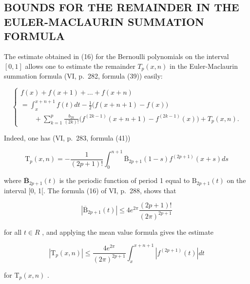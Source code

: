 \subsection{BOUNDS FOR THE REMAINDER IN THE EULER-MACLAURIN SUMMATION FORMULA}

The estimate obtained in (16) for the Bernoulli polynomials on the interval \([0, 1]\) allows one to estimate the remainder \(T_{p}(x, n)\) in the Euler-Maclaurin summation formula (VI, p.~282, formula (39)) easily:

\[
\left\{ \begin{array}{l} f (x) + f (x + 1) + \dots + f (x + n) \\ = \int_ {x} ^ {x + n + 1} f (t) d t - \frac {1}{2} \bigl (f (x + n + 1) - f (x) \bigr) \\ \qquad + \sum_ {k = 1} ^ {p} \frac {b _ {2 k}}{(2 k) !} \bigl (f ^ {(2 k - 1)} (x + n + 1) - f ^ {(2 k - 1)} (x) \bigr) + T _ {p} (x, n). \end{array} \right.\tag{1}
\]

Indeed, one has (VI, p.~283, formula (41))

\[
\mathrm{T} _ {p} (x, n) = - \frac {1}{(2 p + 1) !} \int_ {0} ^ {n + 1} \overline {{\mathrm{B}}} _ {2 p + 1} (1 - s) f ^ {(2 p + 1)} (x + s) d s\tag{2}
\]

where \(\overline{\mathbf{B}}_{2p + 1}(t)\) is the periodic function of period 1 equal to \(\mathrm{B}_{2p + 1}(t)\) on the interval {[}0, 1{[}. The formula (16) of VI, p.~288, shows that

\[
\left| \overline {{{{\mathrm{B}}}}} _ {2 p + 1} (t) \right| \leqslant 4 e ^ {2 \pi} \frac {(2 p + 1) !}{(2 \pi) ^ {2 p + 1}}\tag{3}
\]

for all \(t \in R\) , and applying the mean value formula gives the estimate

\[
\left| \mathrm{T} _ {p} (x, n) \right| \leqslant \frac {4 e ^ {2 \pi}}{(2 \pi) ^ {2 p + 1}} \int_ {x} ^ {x + n + 1} \left| f ^ {(2 p + 1)} (t) \right| d t\tag{4}
\]

for \(\mathrm{T}_p(x,n)\) .

